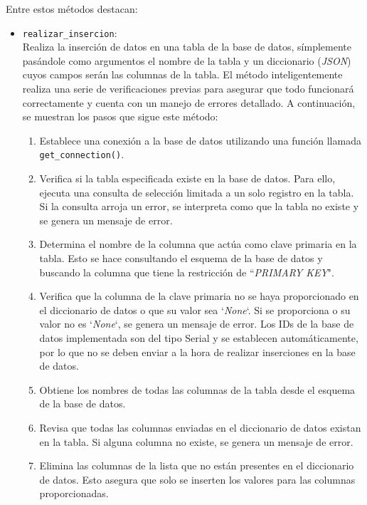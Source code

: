 \documentclass[12pt]{report}
\begin{document}
Entre estos métodos destacan:
\begin{itemize}
    \item \texttt{realizar\_insercion}:
    \\
    Realiza la inserción de datos en una tabla de la base de datos, símplemente pasándole como argumentos el nombre de la tabla y un diccionario (\textit{JSON}) cuyos campos serán las columnas de la tabla. El método inteligentemente realiza una serie de verificaciones previas para asegurar que todo funcionará correctamente y cuenta con un manejo de errores detallado. A continuación, se muestran los pasos que sigue este método:

\begin{enumerate}
    \item Establece una conexión a la base de datos utilizando una función llamada \texttt{get\_connection()}.
    
    \item Verifica si la tabla especificada existe en la base de datos. Para ello, ejecuta una consulta de selección limitada a un solo registro en la tabla. Si la consulta arroja un error, se interpreta como que la tabla no existe y se genera un mensaje de error.
    
    \item Determina el nombre de la columna que actúa como clave primaria en la tabla. Esto se hace consultando el esquema de la base de datos y buscando la columna que tiene la restricción de ``\textit{PRIMARY KEY}".
    
    \item Verifica que la columna de la clave primaria no se haya proporcionado en el diccionario de datos o que su valor sea `\textit{None}`. Si se proporciona o su valor no es `\textit{None}`, se genera un mensaje de error. Los IDs de la base de datos implementada son del tipo Serial y se establecen automáticamente, por lo que no se deben enviar a la hora de realizar inserciones en la base de datos.
    
    \item Obtiene los nombres de todas las columnas de la tabla desde el esquema de la base de datos.
    
    \item Revisa que todas las columnas enviadas en el diccionario de datos existan en la tabla. Si alguna columna no existe, se genera un mensaje de error.
    
    \item Elimina las columnas de la lista que no están presentes en el diccionario de datos. Esto asegura que solo se inserten los valores para las columnas proporcionadas.
    

\end{enumerate}
\end{itemize}
\end{document}
